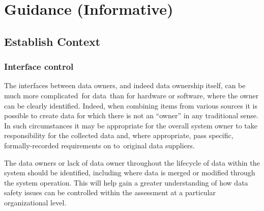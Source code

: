 %
%
\section{Guidance (Informative)} \label{bkm:guidance}



\subsection{Establish Context}
\subsubsection{Interface control}
The interfaces between \glspl{data owner}, and indeed data ownership itself, can be much more complicated\cbstart\ for data\cbend\ than for hardware or software, where the owner can be clearly identified. Indeed, when combining items from various sources it is possible to create data for which there is not an ``owner'' in any traditional sense. In such circumstances it may be appropriate for the overall system owner to take responsibility for the collected data and, where appropriate, pass specific, formally-recorded requirements \cbstart on to\cbend\ original data suppliers. 

The \cbstart {}\glspl{data owner} or lack of data owner throughout the lifecycle of data within the system should be identified\cbend, including where data is merged or modified through the system operation. This will \cbstart help gain a greater understanding of how data safety issues can be controlled \cbend within the assessment at a particular organizational level.

